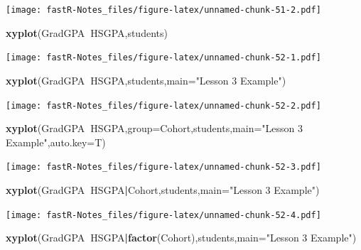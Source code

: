 \documentclass[]{book}
\newenvironment{Shaded}{\begin{snugshade}}{\end{snugshade}}
\newcommand{\KeywordTok}[1]{\textcolor[rgb]{0.13,0.29,0.53}{\textbf{#1}}}
\newcommand{\DataTypeTok}[1]{\textcolor[rgb]{0.13,0.29,0.53}{#1}}
\newcommand{\StringTok}[1]{\textcolor[rgb]{0.31,0.60,0.02}{#1}}
\newcommand{\OperatorTok}[1]{\textcolor[rgb]{0.81,0.36,0.00}{\textbf{#1}}}
\newcommand{\NormalTok}[1]{#1}
\theoremstyle{definition}
\theoremstyle{definition}
\theoremstyle{definition}
\theoremstyle{remark}
\begin{document}
\texttt{[image: fastR-Notes\_files/figure-latex/unnamed-chunk-51-2.pdf]}

\begin{Shaded}
\begin{Highlighting}[]
\KeywordTok{xyplot}\NormalTok{(GradGPA}\OperatorTok{~}\NormalTok{HSGPA,students)}
\end{Highlighting}
\end{Shaded}

\texttt{[image: fastR-Notes\_files/figure-latex/unnamed-chunk-52-1.pdf]}

\begin{Shaded}
\begin{Highlighting}[]
\KeywordTok{xyplot}\NormalTok{(GradGPA}\OperatorTok{~}\NormalTok{HSGPA,students,}\DataTypeTok{main=}\StringTok{"Lesson 3 Example"}\NormalTok{)}
\end{Highlighting}
\end{Shaded}

\texttt{[image: fastR-Notes\_files/figure-latex/unnamed-chunk-52-2.pdf]}

\begin{Shaded}
\begin{Highlighting}[]
\KeywordTok{xyplot}\NormalTok{(GradGPA}\OperatorTok{~}\NormalTok{HSGPA,}\DataTypeTok{group=}\NormalTok{Cohort,students,}\DataTypeTok{main=}\StringTok{"Lesson 3 Example"}\NormalTok{,}\DataTypeTok{auto.key=}\NormalTok{T)}
\end{Highlighting}
\end{Shaded}

\texttt{[image: fastR-Notes\_files/figure-latex/unnamed-chunk-52-3.pdf]}

\begin{Shaded}
\begin{Highlighting}[]
\KeywordTok{xyplot}\NormalTok{(GradGPA}\OperatorTok{~}\NormalTok{HSGPA}\OperatorTok{|}\NormalTok{Cohort,students,}\DataTypeTok{main=}\StringTok{"Lesson 3 Example"}\NormalTok{)}
\end{Highlighting}
\end{Shaded}

\texttt{[image: fastR-Notes\_files/figure-latex/unnamed-chunk-52-4.pdf]}

\begin{Shaded}
\begin{Highlighting}[]
\KeywordTok{xyplot}\NormalTok{(GradGPA}\OperatorTok{~}\NormalTok{HSGPA}\OperatorTok{|}\KeywordTok{factor}\NormalTok{(Cohort),students,}\DataTypeTok{main=}\StringTok{"Lesson 3 Example"}\NormalTok{)}
\end{Highlighting}
\end{Shaded}
\end{document}
